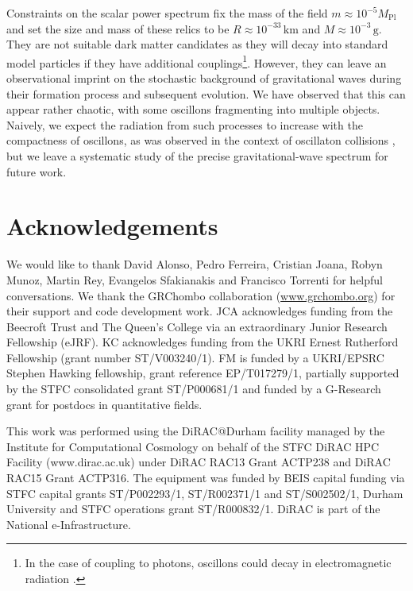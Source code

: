 \documentclass[
    reprint,
    preprintnumbers,
    superscriptaddress,
    nofootinbib,
     amsmath,amssymb,
     aps,
     prd,
    floatfix,
    ]{revtex4-2}
\newcommand{\mpl}{M_\mathrm{Pl}}
\begin{document}
Constraints on the scalar power spectrum fix the mass of the field $m\approx 10^{-5}\mpl$ and set the size and mass of these relics to be $R\approx 10^{-33} \,\mathrm{km}$ and $M\approx 10^{-3} \,\mathrm{g}$. They are not suitable dark matter candidates as they will decay into standard model particles if they have additional couplings\footnote{In the case of coupling to photons, oscillons could decay in electromagnetic radiation \cite{Levkov:2020txo,Chung-Jukko:2023cow}.}. However, they can leave an observational imprint on the stochastic background of gravitational waves during their formation process and subsequent evolution. We have observed that this can appear rather chaotic, with some oscillons fragmenting into multiple objects. Naively, we expect the radiation from such processes to increase with the compactness of oscillons, as was observed in the context of oscillaton collisions \cite{Helfer:2018vtq}, but we leave a systematic study of the precise gravitational-wave spectrum for future work.

\section*{Acknowledgements}

We would like to thank David Alonso, Pedro Ferreira, Cristian Joana, Robyn Munoz, Martin Rey, Evangelos Sfakianakis and Francisco Torrenti for helpful conversations. We thank the GRChombo collaboration (\href{www.grchombo.org}{www.grchombo.org}) for their support and code development work. JCA acknowledges funding from the Beecroft Trust and The Queen’s College via an extraordinary Junior Research Fellowship (eJRF). KC acknowledges funding from the UKRI Ernest Rutherford Fellowship (grant number ST/V003240/1). FM is funded by a UKRI/EPSRC Stephen Hawking fellowship, grant reference EP/T017279/1, partially supported by the STFC consolidated grant ST/P000681/1 and funded by a G-Research grant for postdocs in quantitative fields. 

This work was performed using the DiRAC@Durham facility managed by the Institute for Computational Cosmology on behalf of the STFC DiRAC HPC Facility (www.dirac.ac.uk) under DiRAC RAC13 Grant ACTP238 and DiRAC RAC15 Grant ACTP316. The equipment was funded by BEIS capital funding via STFC capital grants ST/P002293/1, ST/R002371/1 and ST/S002502/1, Durham University and STFC operations grant ST/R000832/1. DiRAC is part of the National e-Infrastructure.
\end{document}
